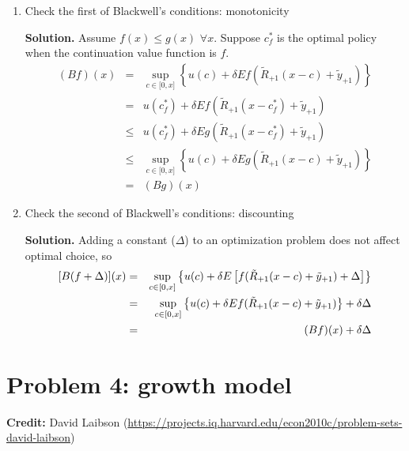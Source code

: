 \documentclass[11pt]{extarticle}
\theoremstyle{plain}
\theoremstyle{definition}
\begin{document}
\vspace{10mm}
\noindent
\begin{enumerate}
\item Check the first of Blackwell's conditions: monotonicity

\textbf{Solution.} Assume $f(x)\leq g(x)$ $\forall x$. Suppose $%
c_{f}^{\ast }$ is the optimal policy when the continuation value function is 
$f.$%
\begin{eqnarray*}
	(Bf)(x) &=&\sup_{c\in \lbrack 0,x]}\left\{ u(c)+\delta Ef(\tilde{R}%
	_{+1}(x-c)+\tilde{y}_{+1})\right\} \\
	&=&u(c_{f}^{\ast })+\delta Ef(\tilde{R}_{+1}(x-c_{f}^{\ast })+\tilde{y}_{+1})
	\\
	&\leq &u(c_{f}^{\ast })+\delta Eg(\tilde{R}_{+1}(x-c_{f}^{\ast })+\tilde{y}%
	_{+1}) \\
	&\leq &\sup_{c\in \lbrack 0,x]}\left\{ u(c)+\delta Eg(\tilde{R}_{+1}(x-c)+%
	\tilde{y}_{+1})\right\} \\
	&=&(Bg)(x)
\end{eqnarray*}

\item Check the second of Blackwell's conditions: discounting

\textbf{Solution.} Adding a constant ($\Delta $) to an optimization problem does not affect optimal choice, so
\begin{eqnarray*}
	\lbrack B(f+\Delta )](x) &=&\sup_{c\in \lbrack 0,x]}\left\{ u(c)+\delta E 
	\left[ f(\tilde{R}_{+1}(x-c)+\tilde{y}_{+1})+\Delta \right] \right\} \\
	&=&\sup_{c\in \lbrack 0,x]}\left\{ u(c)+\delta Ef(\tilde{R}_{+1}(x-c)+\tilde{%
		y}_{+1})\right\} +\delta \Delta \\
	&=&(Bf)(x)+\delta \Delta
\end{eqnarray*}

\end{enumerate}





\vspace{10mm}
\section*{Problem 4: growth model}

\textbf{Credit:} David Laibson (\url{https://projects.iq.harvard.edu/econ2010c/problem-sets-david-laibson})
\end{document}
